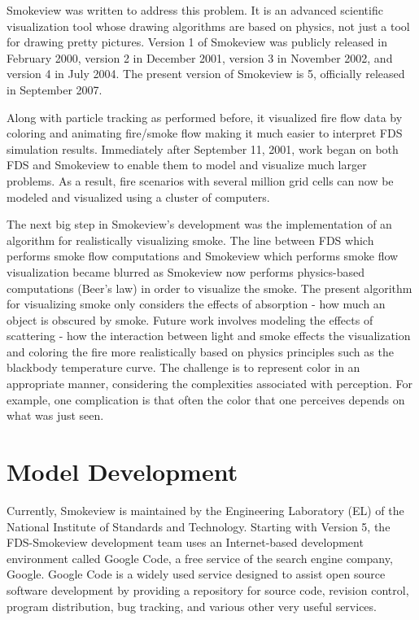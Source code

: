 \documentclass[11pt,twoside]{book}
\begin{document}
Smokeview was written to address this problem. It is an advanced scientific visualization tool whose drawing algorithms are based on physics, not just a tool for drawing pretty pictures. Version 1 of Smokeview was publicly released in February 2000, version 2 in December 2001, version 3 in November 2002, and version 4 in July 2004. The present version of Smokeview is 5, officially released in September 2007.

Along with particle tracking as performed before, it visualized fire flow data by coloring and animating fire/smoke flow making it much easier to interpret FDS simulation results.  Immediately after September 11, 2001, work began on both FDS and Smokeview to enable them to model and visualize much larger problems.  As a result, fire scenarios with several million grid cells can now be modeled and visualized using a cluster of computers.

The next big step in Smokeview's development was the implementation of an algorithm for realistically visualizing smoke. The line between FDS which performs smoke flow computations and Smokeview which performs smoke flow visualization became blurred as Smokeview now performs physics-based computations (Beer's law) in order to visualize the smoke.  The present algorithm for visualizing smoke only considers the effects of absorption - how much an object is obscured by smoke.  Future work involves modeling the effects of scattering - how the interaction between light and smoke effects the visualization and coloring the fire more realistically based on physics principles such as the blackbody temperature curve.  The challenge is to represent color in an appropriate manner, considering the complexities associated with perception.  For example, one complication is that often the color that one perceives depends on what was just seen.

%
%

\section{Model Development}
Currently, Smokeview is maintained by the Engineering Laboratory (EL) of the National Institute of Standards and Technology. Starting with Version 5, the FDS-Smokeview development team uses an Internet-based development environment called Google Code, a free service of the search engine company, Google. Google Code is a widely used service designed to assist open source software development by providing a repository for source code, revision control, program distribution, bug tracking, and various other very useful services.
\end{document}
